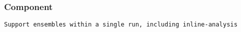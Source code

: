 \documentclass[14pt,letter]{article}
\begin{document}
\subsubsection{ Component}

\begin{verbatim}
Support ensembles within a single run, including inline-analysis

\end{verbatim}




\end{document}
